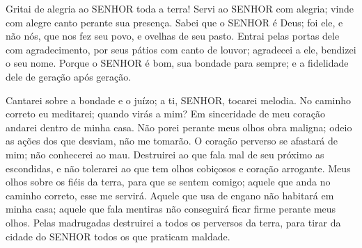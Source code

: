 

{\PP 
  Gritai de alegria ao SENHOR toda a terra!
  Servi ao SENHOR com alegria; vinde com alegre canto perante sua presença.
  Sabei que o SENHOR é Deus; foi ele, e não nós, que nos fez seu povo, e ovelhas de seu pasto.
  Entrai pelas portas dele com agradecimento, por seus pátios com canto de louvor; agradecei a ele,
{} bendizei o seu nome.
  Porque o SENHOR é bom, sua bondade
{} para sempre; e a fidelidade dele
{} de geração após geração.
\par }


{\PP 
  Cantarei sobre a bondade e o juízo; a ti, SENHOR, tocarei melodia.
  No caminho correto eu meditarei;
{} quando virás a mim? Em sinceridade de meu coração andarei dentro de minha casa.
  Não porei perante meus olhos obra maligna; odeio as ações dos que desviam,
{} não me tomarão.
  O coração perverso se afastará de mim; não conhecerei ao mau.
  Destruirei ao que fala mal de seu próximo as escondidas, e não tolerarei ao que tem olhos cobiçosos e coração arrogante.
  Meus olhos
{} sobre os fiéis da terra, para que se sentem comigo; aquele que anda no caminho correto, esse me servirá.
  Aquele que usa de engano não habitará em minha casa; aquele que fala mentiras não conseguirá ficar firme perante meus olhos.
  Pelas madrugadas destruirei a todos os perversos da terra, para tirar da cidade do SENHOR todos os que praticam maldade.
\par }

